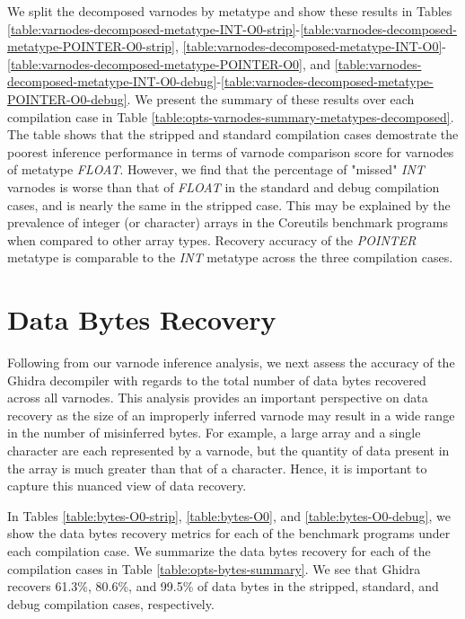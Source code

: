 

We split the decomposed varnodes by metatype and show these results in Tables \ref{table:varnodes-decomposed-metatype-INT-O0-strip}-\ref{table:varnodes-decomposed-metatype-POINTER-O0-strip}, \ref{table:varnodes-decomposed-metatype-INT-O0}-\ref{table:varnodes-decomposed-metatype-POINTER-O0}, and \ref{table:varnodes-decomposed-metatype-INT-O0-debug}-\ref{table:varnodes-decomposed-metatype-POINTER-O0-debug}. We present the summary of these results over each compilation case in Table \ref{table:opts-varnodes-summary-metatypes-decomposed}. The table shows that the stripped and standard compilation cases demostrate the poorest inference performance in terms of varnode comparison score for varnodes of metatype \emph{FLOAT}. However, we find that the percentage of "missed" \emph{INT} varnodes is worse than that of \emph{FLOAT} in the standard and debug compilation cases, and is nearly the same in the stripped case. This may be explained by the prevalence of integer (or character) arrays in the Coreutils benchmark programs when compared to other array types. Recovery accuracy of the \emph{POINTER} metatype is comparable to the \emph{INT} metatype across the three compilation cases.

\section{Data Bytes Recovery}

Following from our varnode inference analysis, we next assess the accuracy of the Ghidra decompiler with regards to the total number of data bytes recovered across all varnodes. This analysis provides an important perspective on data recovery as the size of an improperly inferred varnode may result in a wide range in the number of misinferred bytes. For example, a large array and a single character are each represented by a varnode, but the quantity of data present in the array is much greater than that of a character. Hence, it is important to capture this nuanced view of data recovery.



In Tables \ref{table:bytes-O0-strip}, \ref{table:bytes-O0}, and \ref{table:bytes-O0-debug}, we show the data bytes recovery metrics for each of the benchmark programs under each compilation case. We summarize the data bytes recovery for each of the compilation cases in Table \ref{table:opts-bytes-summary}. We see that Ghidra recovers 61.3\%, 80.6\%, and 99.5\% of data bytes in the stripped, standard, and debug compilation cases, respectively.

